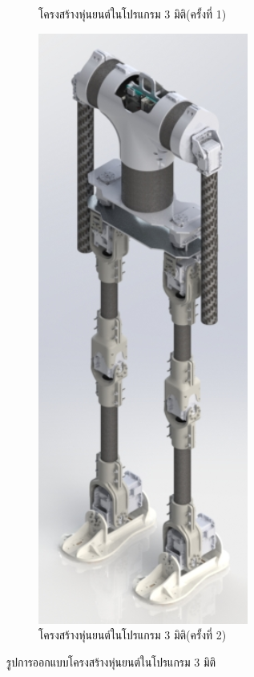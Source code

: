 \begin{figure}[!ht]
\begin{subfigure}[b]{0.2\linewidth}
    \caption{โครงสร้างหุ่นยนต์ในโปรแกรม 3 มิติ(ครั้งที่ 1)}
  \end{subfigure}
  \begin{subfigure}[b]{0.175\linewidth}
    \includegraphics[width=\linewidth]{chapter4/images/uthai_humanoid.PNG}
    \caption{โครงสร้างหุ่นยนต์ในโปรแกรม 3 มิติ(ครั้งที่ 2)}
  \end{subfigure}
  \caption{รูปการออกแบบโครงสร้างหุ่นยนต์ในโปรแกรม 3 มิติ}
  \label{fig:UTHAI_humanoid}
\end{figure}

